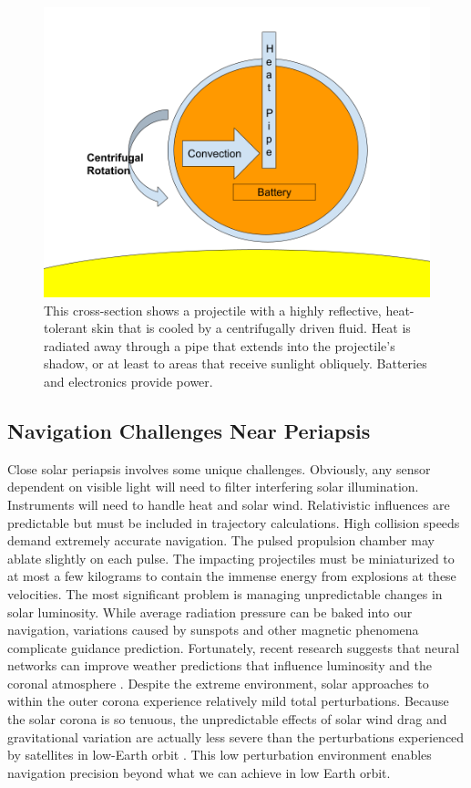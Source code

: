 \documentclass{article}
\begin{document}
{\begin{figure}
    \centering
    \includegraphics[width=0.5\linewidth]{images/Parker Projectile Cross Section.png}
    \caption{This cross-section shows a projectile with a highly reflective, heat-tolerant skin that is cooled by a centrifugally driven fluid. Heat is radiated away through a pipe that extends into the projectile's shadow, or at least to areas that receive sunlight obliquely. Batteries and electronics provide power.}
    \label{fig:parker_cross_section}
\end{figure}

\subsection{Navigation Challenges Near Periapsis}\label{sec:periapsis_challenges}
Close solar periapsis involves some unique challenges.   Obviously, any sensor dependent on visible light will need to filter interfering solar illumination.   Instruments will need to handle heat and solar wind.  Relativistic influences are predictable but must be included in trajectory calculations.  High collision speeds demand extremely accurate navigation.   The pulsed propulsion chamber may ablate slightly on each pulse.  The impacting projectiles must be miniaturized to at most a few kilograms to contain the immense energy from explosions at these velocities. The most significant problem is managing unpredictable changes in solar luminosity.  While average radiation pressure can be baked into our navigation, variations caused by sunspots and other magnetic phenomena complicate guidance prediction. Fortunately, recent research suggests that neural networks can improve weather predictions that influence luminosity and the coronal atmosphere \cite{lam2023learning}.  Despite the extreme environment, solar approaches to within the outer corona experience relatively mild total perturbations. Because the solar corona is so tenuous, the unpredictable effects of solar wind drag and gravitational variation are actually less severe than the perturbations experienced by satellites in low-Earth orbit \cite{leo_orbit_perturbation_simulation, corona_density}.  This low perturbation environment enables navigation precision beyond what we can achieve in low Earth orbit.
  
}
\end{document}
